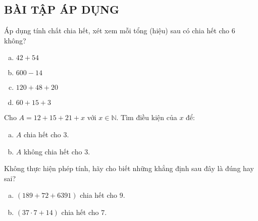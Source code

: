 \subsection{BÀI TẬP ÁP DỤNG}
\begin{bt} Áp dụng tính chất chia hết, xét xem mỗi tổng (hiệu) sau có chia hết cho $6$ không?
\begin{multicols}{2}
\begin{enumerate}[a)]
\item $42 + 54$
\item $600 - 14$
\item $120 + 48 + 20$
\item $60 + 15 + 3$
\end{enumerate}
\end{multicols}
\end{bt}    \begin{bt} Cho $A = 12 + 15 + 21 + x$ với $x \in \mathbb{N}$. Tìm điều kiện của $x$ để:
\begin{enumerate}[a)]
\item $A$ chia hết cho $3$.
\item $A$ không chia hết cho $3$.
\end{enumerate}
\end{bt}    \begin{bt} 
Không thực hiện phép tính, hãy cho biết những khẳng định sau đây là đúng hay sai?
\begin{enumerate}[a)]
\item $\left( {189 + 72 + 6391} \right) $ chia hết cho $9$.
\item $\left( {37 \cdot 7 + 14} \right) $ chia hết cho $7$.
\end{enumerate}


\end{bt}
